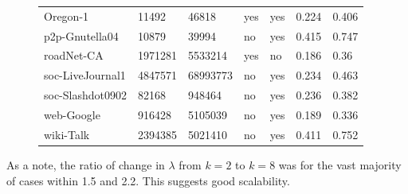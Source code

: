 \begin{figure}
{\begin{tabular}{ *7l }
Oregon-1 & 11492 & 46818 & yes & yes & 0.224&0.406\\
p2p-Gnutella04 & 10879 & 39994 & no & yes & 0.415&0.747\\
roadNet-CA & 1971281 & 5533214 & yes & no & 0.186&0.36\\
soc-LiveJournal1 & 4847571 & 68993773 & no & yes &0.234& 0.463\\
soc-Slashdot0902 & 82168 & 948464 & no & yes &0.236&0.382\\
web-Google & 916428 & 5105039 & no & yes &0.189&0.336\\
wiki-Talk & 2394385 & 5021410 & no & yes &0.411&0.752\\
 \hline
\end{tabular}\par
}
\end{figure}

As a note, the ratio of change in $\lambda$ from $k=2$ to $k=8$ was for the vast majority of cases within 1.5 and 2.2. 
This suggests good scalability.



